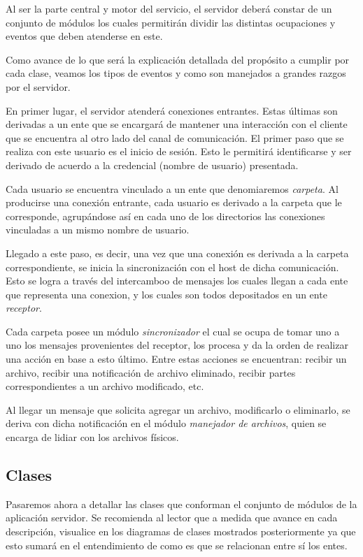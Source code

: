\documentclass{article}
\begin{document}
	Al ser la parte central y motor del servicio, el servidor deberá constar de un conjunto de módulos los cuales permitirán dividir las distintas ocupaciones y eventos que deben atenderse en este.
	\par
	Como avance de lo que será la explicación detallada del propósito a cumplir por cada clase, veamos los tipos de eventos y como son manejados a grandes razgos por el servidor.
	\par
	En primer lugar, el servidor atenderá conexiones entrantes. Estas últimas son derivadas a un ente que se encargará de mantener una interacción con el cliente que se encuentra al otro lado del canal de comunicación. El primer paso que se realiza con este usuario es el inicio de sesión. Esto le permitirá identificarse y ser derivado de acuerdo a la credencial (nombre de usuario) presentada. 
	\par
	Cada usuario se encuentra vinculado a un ente que denomiaremos \textit{carpeta}. Al producirse una conexión entrante, cada usuario es derivado a la carpeta que le corresponde, agrupándose así en cada uno de los directorios las conexiones vinculadas a un mismo nombre de usuario.
	\par
	Llegado a este paso, es decir, una vez que una conexión es derivada a la carpeta correspondiente, se inicia la sincronización con el host de dicha comunicación. Esto se logra a través del intercamboo de mensajes los cuales llegan a cada ente que representa una conexion, y los cuales son todos depositados en un ente \textit{receptor}.
	\par
	Cada carpeta posee un módulo \textit{sincronizador} el cual se ocupa de tomar uno a uno los mensajes provenientes del receptor, los procesa y da la orden de realizar una acción en base a esto último. Entre estas acciones se encuentran: recibir un archivo, recibir una notificación de archivo eliminado, recibir partes correspondientes a un archivo modificado, etc.
	\par
	Al llegar un mensaje que solicita agregar un archivo, modificarlo o eliminarlo, se deriva con dicha notificación en el módulo \textit{manejador de archivos}, quien se encarga de lidiar con los archivos físicos.
\bigskip



\subsection{Clases}

	Pasaremos ahora a detallar las clases que conforman el conjunto de módulos de la aplicación servidor. Se recomienda al lector que a medida que avance en cada descripción, visualice en los diagramas de clases mostrados posteriormente ya que esto sumará en el entendimiento de como es que se relacionan entre sí los entes.
\end{document}
